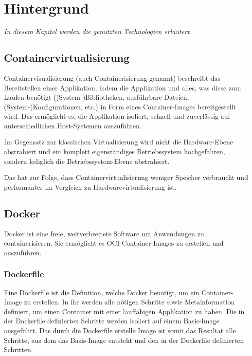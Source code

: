 \chapter{Hintergrund}

\label{cha:background}
\textit{In diesem Kapitel werden die genutzten Technologien erläutert}

\section{Containervirtualisierung}

Containervisualisierung (auch Containerisierung genannt) beschreibt das Bereitstellen einer Applikation, indem die Applikation und alles, was diese zum Laufen benötigt ((System-)Bibliotheken, ausführbare Dateien, (System-)Konfigurationen, etc.) in Form eines Container-Images bereitgestellt wird. Das ermöglicht es, die Applikation isoliert, schnell und zuverlässig auf unterschiedlichen Host-Systemen auszuführen.

Im Gegensatz zur klassischen Virtualisierung wird nicht die Hardware-Ebene abstrahiert und ein komplett eigenständiges Betriebssystem hochgefahren, sondern lediglich die Betriebssystem-Ebene abstrahiert.

Das hat zur Folge, dass Containervirtualisierung weniger Speicher verbraucht und performanter im Vergleich zu Hardwarevirtualisierung ist.

\section{Docker}

Docker ist eine freie, weitverbreitete Software um Anwendungen zu containerisieren. Sie ermöglicht es OCI-Container-Images zu erstellen und auszuführen.

\subsection{Dockerfile}

Eine Dockerfile ist die Definition, welche Docker benötigt, um ein Container-Image zu erstellen. In ihr werden alle nötigen Schritte sowie Metainformation definiert, um einen Container mit einer lauffähigen Applikation zu haben. Die in der Dockerfile definierten Schritte werden isoliert auf einem Basis-Image ausgeführt. Das durch die Dockerfile erstelle Image ist somit das Resultat alle Schritte, aus dem das Basis-Image entsteht und den in der Dockerfile definierten Schritten.

